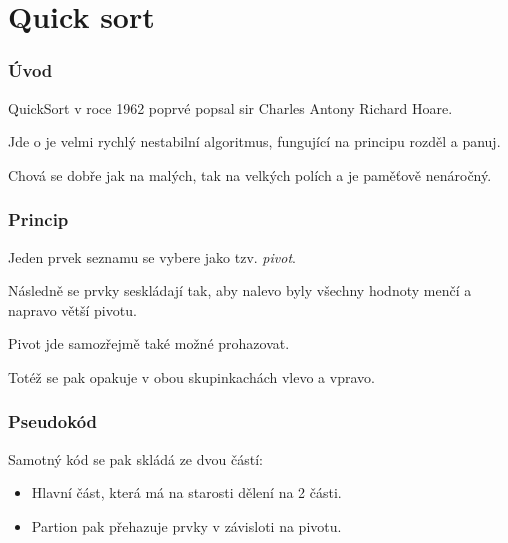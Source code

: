 \documentclass{beamer}
\begin{document}
\section{Quick sort}
\begin{frame}
\frametitle{Úvod}
QuickSort v roce 1962 poprvé popsal sir Charles Antony Richard Hoare.

Jde o je velmi rychlý nestabilní algoritmus, fungující na principu rozděl a panuj.

Chová se dobře jak na malých, tak na velkých polích a je paměťově nenáročný.\cite{uvod}
\end{frame}
\begin{frame}
\frametitle{Princip}
Jeden prvek seznamu se vybere jako tzv. \textit{pivot}. 

Následně se prvky seskládají tak, aby nalevo byly všechny hodnoty menčí a napravo větší pivotu.

Pivot jde samozřejmě také možné prohazovat.

Totéž se pak opakuje v obou skupinkachách vlevo a vpravo. \cite{popis}

\end{frame}
\begin{frame}
    \bigskip
	\begin{center}
	\end{center}
\end{frame}
\begin{frame}
\frametitle{Pseudokód}
	Samotný kód se pak skládá ze dvou částí:
	\begin{itemize}
	\item Hlavní část, která má na starosti dělení na 2 části.
	\item Partion pak přehazuje prvky v závisloti na pivotu.
	\end{itemize}
	
\end{frame}
\end{document}
